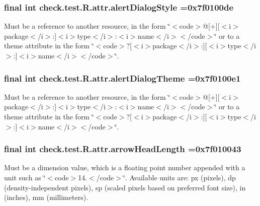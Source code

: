\subsubsection[{alert\+Dialog\+Style}]{\setlength{\rightskip}{0pt plus 5cm}final int check.\+test.\+R.\+attr.\+alert\+Dialog\+Style =0x7f0100de\hspace{0.3cm}{\ttfamily [static]}}\label{classcheck_1_1test_1_1_r_1_1attr_a266f3305ed6d39e276ec791931594f34}
Must be a reference to another resource, in the form \char`\"{}$<$code$>$@\mbox{[}+\mbox{]}\mbox{[}$<$i$>$package$<$/i$>$\+:\mbox{]}$<$i$>$type$<$/i$>$\+:$<$i$>$name$<$/i$>$$<$/code$>$\char`\"{} or to a theme attribute in the form \char`\"{}$<$code$>$?\mbox{[}$<$i$>$package$<$/i$>$\+:\mbox{]}\mbox{[}$<$i$>$type$<$/i$>$\+:\mbox{]}$<$i$>$name$<$/i$>$$<$/code$>$\char`\"{}. \hypertarget{classcheck_1_1test_1_1_r_1_1attr_a84ef9b5b92050e30d524366c5ea5bee4}{}
\subsubsection[{alert\+Dialog\+Theme}]{\setlength{\rightskip}{0pt plus 5cm}final int check.\+test.\+R.\+attr.\+alert\+Dialog\+Theme =0x7f0100e1\hspace{0.3cm}{\ttfamily [static]}}\label{classcheck_1_1test_1_1_r_1_1attr_a84ef9b5b92050e30d524366c5ea5bee4}
Must be a reference to another resource, in the form \char`\"{}$<$code$>$@\mbox{[}+\mbox{]}\mbox{[}$<$i$>$package$<$/i$>$\+:\mbox{]}$<$i$>$type$<$/i$>$\+:$<$i$>$name$<$/i$>$$<$/code$>$\char`\"{} or to a theme attribute in the form \char`\"{}$<$code$>$?\mbox{[}$<$i$>$package$<$/i$>$\+:\mbox{]}\mbox{[}$<$i$>$type$<$/i$>$\+:\mbox{]}$<$i$>$name$<$/i$>$$<$/code$>$\char`\"{}. \hypertarget{classcheck_1_1test_1_1_r_1_1attr_aea9df94f1b7f07026ded34d24018677d}{}
\subsubsection[{arrow\+Head\+Length}]{\setlength{\rightskip}{0pt plus 5cm}final int check.\+test.\+R.\+attr.\+arrow\+Head\+Length =0x7f010043\hspace{0.3cm}{\ttfamily [static]}}\label{classcheck_1_1test_1_1_r_1_1attr_aea9df94f1b7f07026ded34d24018677d}
Must be a dimension value, which is a floating point number appended with a unit such as \char`\"{}$<$code$>$14.\+5sp$<$/code$>$\char`\"{}. Available units are\+: px (pixels), dp (density-\/independent pixels), sp (scaled pixels based on preferred font size), in (inches), mm (millimeters). 

